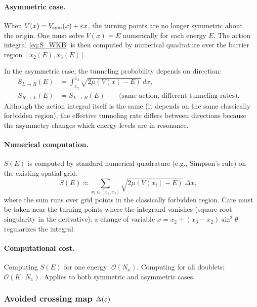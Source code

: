 \paragraph{Asymmetric case.}

When $V(x) = V_{\text{sym}}(x) + \varepsilon x$, the turning points are no longer symmetric about the origin.
One must solve $V(x) = E$ numerically for each energy $E$.
The action integral \cref{eq:S_WKB} is then computed by numerical quadrature over the barrier region $[x_2(E), x_3(E)]$.

In the asymmetric case, the tunneling probability depends on direction:
\begin{align}
  S_{L\to R}(E) &= \int_{x_2}^{x_3} \sqrt{2\mu(V(x) - E)}\,dx,\label{eq:S_WKB_LR}\\
  S_{R\to L}(E) &= S_{L\to R}(E) \qquad\text{(same action, different tunneling rates)}.
\end{align}
Although the action integral itself is the same (it depends on the same classically forbidden region), the effective tunneling rate differs between directions because the asymmetry changes which energy levels are in resonance.

\paragraph{Numerical computation.}

$S(E)$ is computed by standard numerical quadrature (e.g., Simpson's rule) on the existing spatial grid:
\begin{equation}
  S(E) \approx \sum_{x_i \in [x_2,x_3]} \sqrt{2\mu(V(x_i) - E)}\,\Delta x,
\end{equation}
where the sum runs over grid points in the classically forbidden region.
Care must be taken near the turning points where the integrand vanishes (square-root singularity in the derivative); a change of variable $x = x_2 + (x_3 - x_2)\sin^2\theta$ regularizes the integral.

\paragraph{Computational cost.}
Computing $S(E)$ for one energy: $\mathcal{O}(N_x)$.
Computing for all doublets: $\mathcal{O}(K\cdot N_x)$.
Applies to both symmetric and asymmetric cases.

\subsubsection{Avoided crossing map $\Delta(\varepsilon)$}\label{sec:avoided_crossing}

